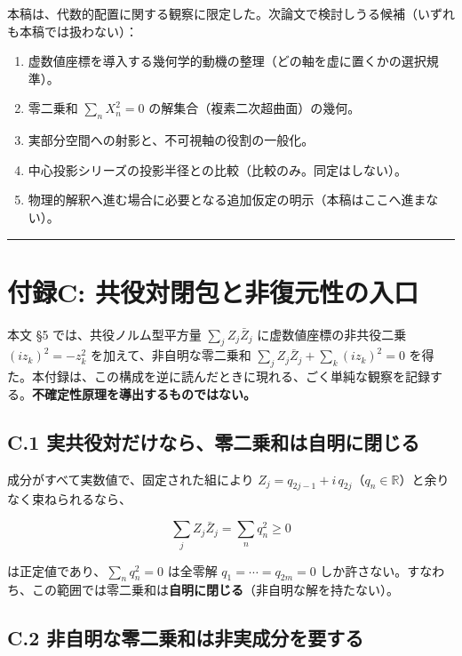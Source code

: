 \documentclass[11pt,a4paper]{ltjsarticle}
\providecommand{\tightlist}{\setlength{\itemsep}{0pt}\setlength{\parskip}{0pt}}
\begin{document}
本稿は、代数的配置に関する観察に限定した。次論文で検討しうる候補（いずれも本稿では扱わない）：

\begin{enumerate}
\def\labelenumi{\arabic{enumi}.}
\tightlist
\item
  虚数値座標を導入する幾何学的動機の整理（どの軸を虚に置くかの選択規準）。
\item
  零二乗和 \(\sum_n X_n^2=0\) の解集合（複素二次超曲面）の幾何。
\item
  実部分空間への射影と、不可視軸の役割の一般化。
\item
  中心投影シリーズの投影半径との比較（比較のみ。同定はしない）。
\item
  物理的解釈へ進む場合に必要となる追加仮定の明示（本稿はここへ進まない）。
\end{enumerate}

\begin{center}\rule{0.5\linewidth}{0.5pt}\end{center}

\section{付録C:
共役対閉包と非復元性の入口}\label{ux4ed8ux9332c-ux5171ux5f79ux5bfeux9589ux5305ux3068ux975eux5fa9ux5143ux6027ux306eux5165ux53e3}

本文 §5 では、共役ノルム型平方量 \(\sum_j Z_j\bar Z_j\)
に虚数値座標の非共役二乗 \((i z_k)^2=-z_k^2\) を加えて、非自明な零二乗和
\(\sum_j Z_j\bar Z_j+\sum_k (i z_k)^2=0\)
を得た。本付録は、この構成を逆に読んだときに現れる、ごく単純な観察を記録する。\textbf{不確定性原理を導出するものではない。}

\subsection{C.1
実共役対だけなら、零二乗和は自明に閉じる}\label{c.1-ux5b9fux5171ux5f79ux5bfeux3060ux3051ux306aux3089ux96f6ux4e8cux4e57ux548cux306fux81eaux660eux306bux9589ux3058ux308b}

成分がすべて実数値で、固定された組により
\(Z_j=q_{2j-1}+i\,q_{2j}\)（\(q_n\in\mathbb{R}\)）と余りなく束ねられるなら、

\[
\sum_j Z_j\bar Z_j=\sum_n q_n^2\ge0
\]

は正定値であり、\(\sum_n q_n^2=0\) は全零解 \(q_1=\cdots=q_{2m}=0\)
しか許さない。すなわち、この範囲では零二乗和は\textbf{自明に閉じる}（非自明な解を持たない）。

\subsection{C.2
非自明な零二乗和は非実成分を要する}\label{c.2-ux975eux81eaux660eux306aux96f6ux4e8cux4e57ux548cux306fux975eux5b9fux6210ux5206ux3092ux8981ux3059ux308b}
\end{document}
